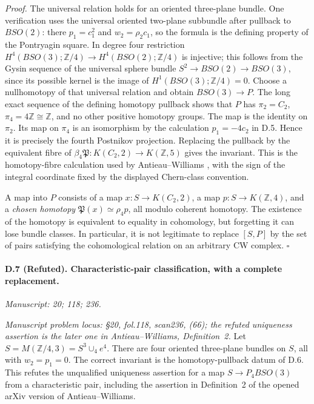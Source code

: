 \emph{Proof.} The universal relation holds for an oriented three-plane bundle. One verification uses the universal oriented two-plane subbundle after pullback to $BSO(2)$: there $p_1=c_1^2$ and $w_2=\rho_2c_1$, so the formula is the defining property of the Pontryagin square. In degree four restriction $H^4(BSO(3);\mathbb Z/4)\to H^4(BSO(2);\mathbb Z/4)$ is injective; this follows from the Gysin sequence of the universal sphere bundle $S^2\to BSO(2)\to BSO(3)$, since its possible kernel is the image of $H^1(BSO(3);\mathbb Z/4)=0$. Choose a nullhomotopy of that universal relation and obtain $BSO(3)\to P$. The long exact sequence of the defining homotopy pullback shows that $P$ has $\pi_2=C_2$, $\pi_4=4\mathbb Z\cong\mathbb Z$, and no other positive homotopy groups. The map is the identity on $\pi_2$. Its map on $\pi_4$ is an isomorphism by the calculation $p_1=-4c_2$ in D.5. Hence it is precisely the fourth Postnikov projection. Replacing the pullback by the equivalent fibre of $\beta_4\mathfrak P:K(C_2,2)\to K(\mathbb Z,5)$ gives the invariant. This is the homotopy-fibre calculation used by Antieau--Williams \citep{AntieauWilliams2014}, with the sign of the integral coordinate fixed by the displayed Chern-class convention.

A map into $P$ consists of a map $x:S\to K(C_2,2)$, a map $p:S\to K(\mathbb Z,4)$, and a \emph{chosen homotopy} $\mathfrak P(x)\simeq\rho_4p$, all modulo coherent homotopy. The existence of the homotopy is equivalent to equality in cohomology, but forgetting it can lose bundle classes. In particular, it is not legitimate to replace $[S,P]$ by the set of pairs satisfying the cohomological relation on an arbitrary CW complex. \hfill$\square$

\paragraph{D.7 (Refuted). Characteristic-pair classification, with a complete replacement.}
\textit{Manuscript: 20; 118; 236.}

\emph{Manuscript problem locus: \S20, fol.118, scan236, (66); the refuted uniqueness assertion is the later one in Antieau--Williams, Definition~2.}
Let $S=M(\mathbb Z/4,3)=S^3\cup_4 e^4$. There are four oriented three-plane bundles on $S$, all with $w_2=p_1=0$. The correct invariant is the homotopy-pullback datum of D.6. This refutes the unqualified uniqueness assertion for a map $S\to P_4BSO(3)$ from a characteristic pair, including the assertion in Definition~2 of the opened arXiv version of Antieau--Williams.

